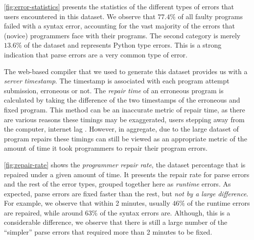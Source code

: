 %
\autoref{fig:error-statistics} presents the statistics
of the different types of errors that users encountered
in this dataset.
%
We observe that $77.4 \% $ of all faulty programs failed
with a syntax error, accounting for the vast majority of
the errors that (novice) programmers face with their
programs.
%
The second category is merely $13.6\%$ of the dataset and
represents Python type errors. This is a strong indication
that parse errors are a very common type of error.

%
The web-based compiler that we used to generate this
dataset provides us with a \emph{server timestamp}.
%
The timestamp is associated with each program attempt
submission, erroneous or not. The \emph{repair time}
of an erroneous program is calculated by taking the
difference of the two timestamps of the erroneous and
fixed program.
%
This method can be an inaccurate metric of repair time,
as there are various reasons these timings may be exaggerated,
\eg users stepping away from the computer, internet lag \etc.
%
However, in aggregate, due to the large
dataset of program repairs these timings
can still be viewed as an appropriate metric
of the amount of time it took programmers to
repair their program errors.

\autoref{fig:repair-rate} shows the \emph{programmer repair rate},
\ie the dataset percentage that is repaired under a given amount of time.
%
It presents the repair rate for parse errors and the rest
of the error types, grouped together here as \emph{runtime} errors.
%
As expected, parse errors are fixed faster than the rest,
but \emph{not by a large difference}.
%
For example, we observe that within 2 minutes,
usually $46\%$ of the runtime errors are repaired, while
around $63\%$ of the syntax errors are.
%
Although, this is a considerable difference,
we observe that there is still a large number
of the ``simpler'' parse errors that required
more than 2 minutes to be fixed.

